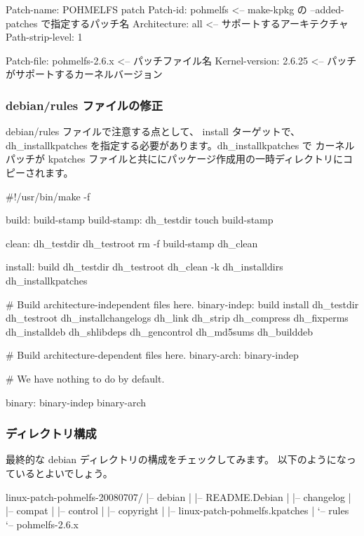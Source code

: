 \documentclass[mingoth,a4paper]{jsarticle}
\begin{document}
\begin{commandline}
Patch-name: POHMELFS patch
Patch-id: pohmelfs <-- make-kpkg の --added-patches で指定するパッチ名 
Architecture: all <-- サポートするアーキテクチャ
Path-strip-level: 1

Patch-file: pohmelfs-2.6.x <-- パッチファイル名
Kernel-version: 2.6.25 <-- パッチがサポートするカーネルバージョン
\end{commandline}

\subsubsection{debian/rules ファイルの修正}
debian/rules ファイルで注意する点として、 install ターゲットで、
dh\_installkpatches を指定する必要があります。dh\_installkpatches で
カーネルパッチが kpatches ファイルと共ににパッケージ作成用の一時ディレクトリにコピーされます。

\begin{commandline}
#!/usr/bin/make -f

build: build-stamp
build-stamp:
        dh_testdir
        touch build-stamp

clean:
        dh_testdir
        dh_testroot
        rm -f build-stamp
        dh_clean

install: build
        dh_testdir
        dh_testroot
        dh_clean -k
        dh_installdirs
        dh_installkpatches

# Build architecture-independent files here.
binary-indep: build install
        dh_testdir
        dh_testroot
        dh_installchangelogs
        dh_link
        dh_strip
        dh_compress
        dh_fixperms
        dh_installdeb
        dh_shlibdeps
        dh_gencontrol
        dh_md5sums
        dh_builddeb

# Build architecture-dependent files here.
binary-arch: binary-indep

# We have nothing to do by default.

binary: binary-indep binary-arch
\end{commandline}

\subsubsection{ディレクトリ構成}
最終的な debian ディレクトリの構成をチェックしてみます。
以下のようになっているとよいでしょう。
\begin{commandline}
linux-patch-pohmelfs-20080707/
|-- debian
|   |-- README.Debian
|   |-- changelog
|   |-- compat
|   |-- control
|   |-- copyright
|   |-- linux-patch-pohmelfs.kpatches
|   `-- rules
`-- pohmelfs-2.6.x
\end{commandline}
\end{document}
